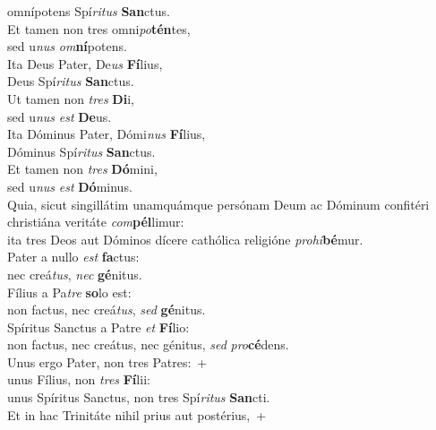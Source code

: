 \oddverse omnípotens Spí\textit{ri}\textit{tus} \textbf{San}ctus.\\
\evenverse Et tamen non tres omni\textit{po}\textbf{tén}tes,~\*\\
\evenverse sed u\textit{nus} \textit{om}\textbf{ní}potens.\\
\oddverse Ita Deus Pater, De\textit{us} \textbf{Fí}lius,~\*\\
\oddverse Deus Spí\textit{ri}\textit{tus} \textbf{San}ctus.\\
\evenverse Ut tamen non \textit{tres} \textbf{Di}i,~\*\\
\evenverse sed u\textit{nus} \textit{est} \textbf{De}us.\\
\oddverse Ita Dóminus Pater, Dómi\textit{nus} \textbf{Fí}lius,~\*\\
\oddverse Dóminus Spí\textit{ri}\textit{tus} \textbf{San}ctus.\\
\evenverse Et tamen non \textit{tres} \textbf{Dó}mini,~\*\\
\evenverse sed u\textit{nus} \textit{est} \textbf{Dó}minus.\\
\oddverse Quia, sicut singillátim unamquámque persónam Deum ac Dóminum confitéri christiána veritáte \textit{com}\textbf{pél}limur:~\*\\
\oddverse ita tres Deos aut Dóminos dícere cathólica religióne \textit{pro}\textit{hi}\textbf{bé}mur.\\
\evenverse Pater a nullo \textit{est} \textbf{fa}ctus:~\*\\
\evenverse nec creá\textit{tus}, \textit{nec} \textbf{gé}nitus.\\
\oddverse Fílius a Pa\textit{tre} \textbf{so}lo est:~\*\\
\oddverse non factus, nec creá\textit{tus}, \textit{sed} \textbf{gé}nitus.\\
\evenverse Spíritus Sanctus a Patre \textit{et} \textbf{Fí}lio:~\*\\
\evenverse non factus, nec creátus, nec génitus, \textit{sed} \textit{pro}\textbf{cé}dens.\\
\oddverse Unus ergo Pater, non tres Patres:~+\\
\oddverse  unus Fílius, non \textit{tres} \textbf{Fí}lii:~\*\\
\oddverse unus Spíritus Sanctus, non tres Spí\textit{ri}\textit{tus} \textbf{San}cti.\\
\evenverse Et in hac Trinitáte nihil prius aut postérius,~+\\
